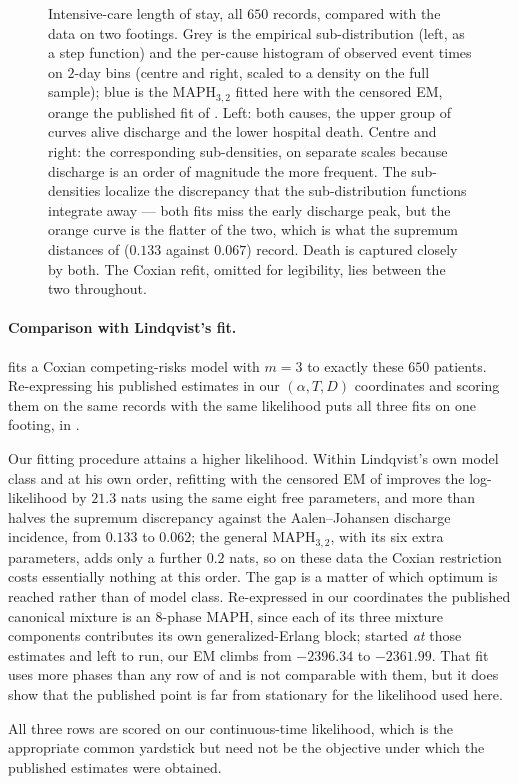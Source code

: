 \documentclass{article}
\newenvironment{rcrevision}{}{}
\newcommand{\aachg}[1]{#1}
\newcommand{\subchg}[1]{#1}
\begin{document}
\begin{figure}[!tb]
\begin{rcrevision}
\caption{\aachg{Intensive-care length of stay, all $650$ records, compared with the data on two footings. Grey is the empirical sub-distribution (left, as a step function) and the per-cause histogram of observed event times on $2$-day bins (centre and right, scaled to a density on the full sample); blue is the $\text{MAPH}_{3,2}$ fitted here with the censored EM, orange the published fit of \citet{lindqvist_phase-type_2022}. Left: both causes, the upper group of curves alive discharge and the lower hospital death. Centre and right: the corresponding sub-densities, on separate scales because discharge is an order of magnitude the more frequent. The sub-densities localize the discrepancy that the sub-distribution functions integrate away --- both fits miss the early discharge peak, but the orange curve is the flatter of the two, which is what the supremum distances of \Cref{tab:icu-lindqvist} ($0.133$ against $0.067$) record. Death is captured closely by both. The Coxian refit, omitted for legibility, lies between the two throughout.}}
\label{fig:icu-cif}
\end{rcrevision}
\end{figure}

\begin{rcrevision}
\paragraph{Comparison with Lindqvist's fit.}
\aachg{\citet{lindqvist_phase-type_2022} fits a Coxian competing-risks model with $m=3$ to exactly these $650$ patients. Re-expressing his published estimates in our $(\alpha,T,D)$ coordinates and scoring them on the same records with the same likelihood puts all three fits on one footing, in \Cref{tab:icu-lindqvist}.}

Our fitting procedure attains a higher likelihood. Within Lindqvist's own model class and at his own order, refitting with the censored EM of  \subchg{improves the log-likelihood by $21.3$ nats using the same eight free parameters, and more than halves the supremum discrepancy against the Aalen--Johansen discharge incidence, from $0.133$ to $0.062$; the general $\text{MAPH}_{3,2}$, with its six extra parameters, adds only a further $0.2$ nats, so on these data the Coxian restriction costs essentially nothing at this order.} \subchg{The gap is a matter of which optimum is reached rather than of model class. Re-expressed in our coordinates the published canonical mixture is an $8$-phase MAPH, since each of its three mixture components contributes its own generalized-Erlang block; started {\em at} those estimates and left to run, our EM climbs from $-2396.34$ to $-2361.99$. That fit uses more phases than any row of \Cref{tab:icu-lindqvist} and is not comparable with them, but it does show that the published point is far from stationary for the likelihood used here.}

\aachg{All three rows are scored on our continuous-time likelihood, which is the appropriate common yardstick but need not be the objective under which the published estimates were obtained.}
\end{rcrevision}
\end{document}
